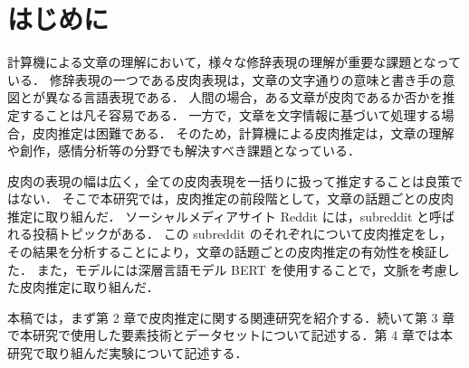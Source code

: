 \newpage
\changeindent{0cm}
\section{はじめに}
\changeindent{2cm}


計算機による文章の理解において，様々な修辞表現の理解が重要な課題となっている．
修辞表現の一つである皮肉表現は，文章の文字通りの意味と書き手の意図とが異なる言語表現である．
人間の場合，ある文章が皮肉であるか否かを推定することは凡そ容易である．
一方で，文章を文字情報に基づいて処理する場合，皮肉推定は困難である．
そのため，計算機による皮肉推定は，文章の理解や創作，感情分析等の分野でも解決すべき課題となっている．
\par
皮肉の表現の幅は広く，全ての皮肉表現を一括りに扱って推定することは良策ではない．
そこで本研究では，皮肉推定の前段階として，文章の話題ごとの皮肉推定に取り組んだ．
ソーシャルメディアサイト Reddit には，subreddit と呼ばれる投稿トピックがある．
この subreddit のそれぞれについて皮肉推定をし，その結果を分析することにより，文章の話題ごとの皮肉推定の有効性を検証した．
また，モデルには深層言語モデル BERT を使用することで，文脈を考慮した皮肉推定に取り組んだ．
\par
本稿では，まず第 2 章で皮肉推定に関する関連研究を紹介する．続いて第 3 章で本研究で使用した要素技術とデータセットについて記述する．第 4 章では本研究で取り組んだ実験について記述する．
